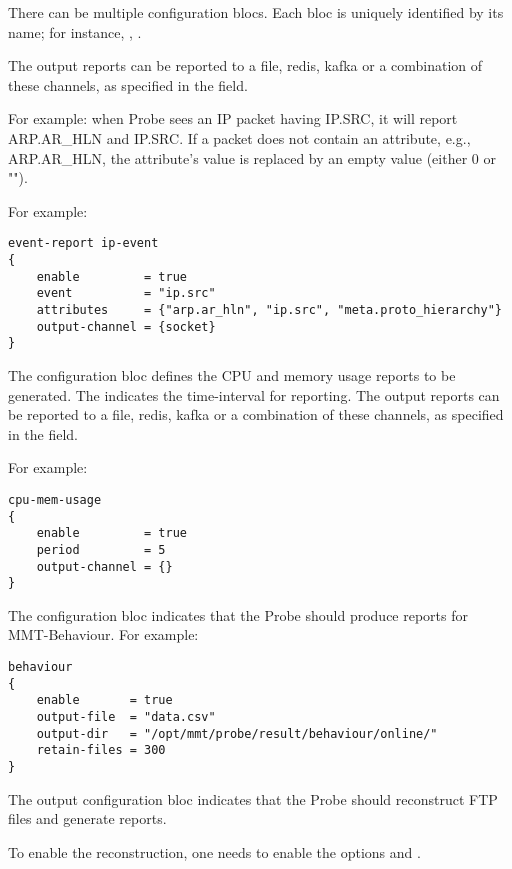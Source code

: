 There can be multiple  configuration blocs. 
Each  bloc is uniquely identified by its name; 
for instance, , . 

The output reports can be reported to a file, redis, kafka or a combination of these channels, as specified in the   field.

For example: when Probe sees an IP packet having IP.SRC, it will report ARP.AR\_HLN and IP.SRC.
If a packet does not contain an attribute, e.g., ARP.AR\_HLN, the attribute's value is replaced by an empty value (either 0 or "").

For example:


\begin{lstlisting}[style=CONFIG]
event-report ip-event
{
    enable         = true
    event          = "ip.src"
    attributes     = {"arp.ar_hln", "ip.src", "meta.proto_hierarchy"}
    output-channel = {socket}
}
\end{lstlisting}

The configuration bloc defines the  CPU and memory usage reports to be generated. 
The  indicates the time-interval for reporting. 
The output reports can be reported to a file, redis, kafka or a combination of these channels, as specified in the   field.

For example:


\begin{lstlisting}[style=CONFIG]
cpu-mem-usage
{   
    enable         = true
    period         = 5 
    output-channel = {}
}
\end{lstlisting}

The configuration bloc indicates that the Probe should produce reports
for MMT-Behaviour. 
For example:

\begin{lstlisting}[style=CONFIG]
behaviour
{
    enable       = true
    output-file  = "data.csv"
    output-dir   = "/opt/mmt/probe/result/behaviour/online/"
    retain-files = 300 
}
\end{lstlisting}


The output configuration bloc indicates that the Probe should reconstruct FTP files and generate reports.
 
To enable the reconstruction, one needs to enable the options  and 
.

